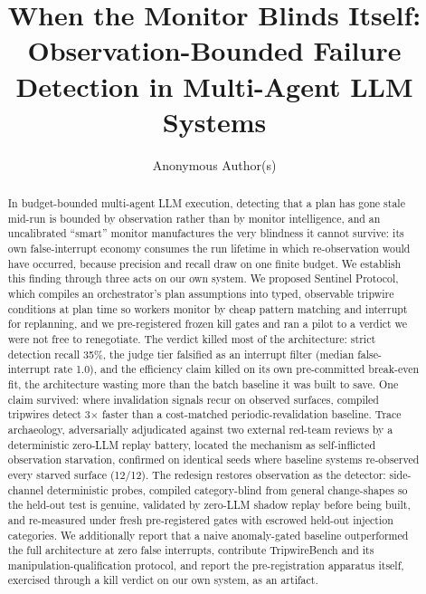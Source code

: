 \documentclass[acmsmall,screen,review,anonymous]{acmart}
\begin{document}
\title{When the Monitor Blinds Itself: Observation-Bounded Failure Detection in Multi-Agent LLM Systems}

\author{Anonymous Author(s)}

\begin{abstract}
In budget-bounded multi-agent LLM execution, detecting that a plan has gone stale mid-run is bounded by observation rather than by monitor intelligence, and an uncalibrated ``smart'' monitor manufactures the very blindness it cannot survive: its own false-interrupt economy consumes the run lifetime in which re-observation would have occurred, because precision and recall draw on one finite budget. We establish this finding through three acts on our own system. We proposed Sentinel Protocol, which compiles an orchestrator's plan assumptions into typed, observable tripwire conditions at plan time so workers monitor by cheap pattern matching and interrupt for replanning, and we pre-registered frozen kill gates and ran a pilot to a verdict we were not free to renegotiate. The verdict killed most of the architecture: strict detection recall 35\%, the judge tier falsified as an interrupt filter (median false-interrupt rate 1.0), and the efficiency claim killed on its own pre-committed break-even fit, the architecture wasting more than the batch baseline it was built to save. One claim survived: where invalidation signals recur on observed surfaces, compiled tripwires detect 3$\times$ faster than a cost-matched periodic-revalidation baseline. Trace archaeology, adversarially adjudicated against two external red-team reviews by a deterministic zero-LLM replay battery, located the mechanism as self-inflicted observation starvation, confirmed on identical seeds where baseline systems re-observed every starved surface (12/12). The redesign restores observation as the detector: side-channel deterministic probes, compiled category-blind from general change-shapes so the held-out test is genuine, validated by zero-LLM shadow replay before being built, and re-measured under fresh pre-registered gates with escrowed held-out injection categories. We additionally report that a naive anomaly-gated baseline outperformed the full architecture at zero false interrupts, contribute TripwireBench and its manipulation-qualification protocol, and report the pre-registration apparatus itself, exercised through a kill verdict on our own system, as an artifact.
\end{abstract}
\end{document}

